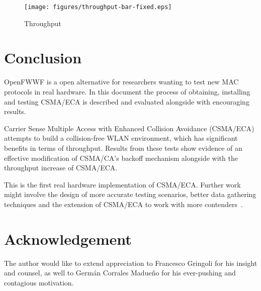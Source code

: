\documentclass[conference]{IEEEtran}
\begin{document}
\begin{figure}[htbp]
\centering
  \texttt{[image: figures/throughput-bar-fixed.eps]}
  \caption{Throughput}
  \label{throughput}
\end{figure}


\section{Conclusion}
OpenFWWF is a open alternative for researchers wanting to test new MAC protocols in real hardware. In this document the process of obtaining, installing and testing CSMA/ECA is described and evaluated alongside with encouraging results.

Carrier Sense Multiple Access with Enhanced Collision Avoidance (CSMA/ECA) attempts to build a collision-free WLAN environment, which has significant benefits in terms of throughput. Results from these tests show evidence of an effective modification of CSMA/CA's backoff mechanism alongside with the throughput increase of CSMA/ECA.

This is the first real hardware implementation of CSMA/ECA. Further work might involve the design of more accurate testing scenarios, better data gathering techniques and the extension of CSMA/ECA to work with more contenders~\cite{research2standards}.

\section{Acknowledgement}
The author would like to extend appreciation to Francesco Gringoli for his insight and counsel, as well to Germán Corrales Madueño for his ever-pushing and contagious motivation.



\end{document}
